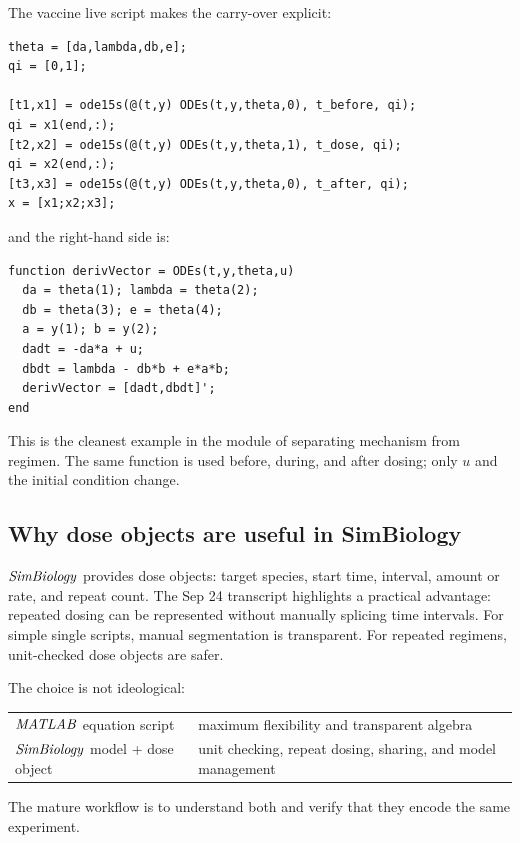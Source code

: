 \documentclass[a4paper]{article}
\newcommand{\MATLAB}{\ensuremath{\pksym{MATLAB}}}
\newcommand{\SimBio}{\ensuremath{\pksym{SimBiology}}}
\newcommand{\code}[1]{\texttt{\detokenize{#1}}}
\begin{document}
The vaccine live script makes the carry-over explicit:
\begin{verbatim}
theta = [da,lambda,db,e];
qi = [0,1];

[t1,x1] = ode15s(@(t,y) ODEs(t,y,theta,0), t_before, qi);
qi = x1(end,:);
[t2,x2] = ode15s(@(t,y) ODEs(t,y,theta,1), t_dose, qi);
qi = x2(end,:);
[t3,x3] = ode15s(@(t,y) ODEs(t,y,theta,0), t_after, qi);
x = [x1;x2;x3];
\end{verbatim}
and the right-hand side is:
\begin{verbatim}
function derivVector = ODEs(t,y,theta,u)
  da = theta(1); lambda = theta(2);
  db = theta(3); e = theta(4);
  a = y(1); b = y(2);
  dadt = -da*a + u;
  dbdt = lambda - db*b + e*a*b;
  derivVector = [dadt,dbdt]';
end
\end{verbatim}
This is the cleanest example in the module of separating mechanism from regimen. The same \code{ODEs} function is used before, during, and after dosing; only \(u\) and the initial condition change.

\begin{center}
\end{center}

\subsection{Why dose objects are useful in SimBiology}

\SimBio{} provides dose objects: target species, start time, interval, amount or rate, and repeat count. The Sep 24 transcript highlights a practical advantage: repeated dosing can be represented without manually splicing time intervals. For simple single scripts, manual segmentation is transparent. For repeated regimens, unit-checked dose objects are safer.

The choice is not ideological:
\begin{center}
\begin{tabularx}{0.88\textwidth}{@{}lX@{}}
\MATLAB{} equation script & maximum flexibility and transparent algebra\\
\SimBio{} model + dose object & unit checking, repeat dosing, sharing, and model management
\end{tabularx}
\end{center}
The mature workflow is to understand both and verify that they encode the same experiment.
\end{document}
